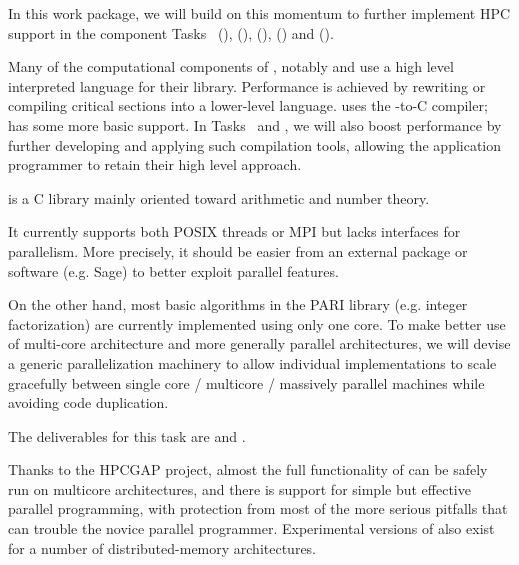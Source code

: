 \begin{workpackage}
\begin{wpdescription}
  In this work package, we will build on this momentum to further implement HPC support in
  the component Tasks~ (\Pari), (\GAP),
   (\Linbox), (\MPIR) and
   (\Singular).
  
  Many of the computational components of \TheProject, notably \Sage
  and \GAP use a high level
  interpreted language for their library. Performance is achieved by
  rewriting or compiling critical sections into a lower-level
  language. \Sage uses
  the \Cython \Python-to-C compiler; \GAP has some more basic support.
  In Tasks~ and , we will also boost performance by
  further developing and applying such compilation tools, allowing the
  application programmer to retain their high level approach.

\end{wpdescription}
\begin{tasklist}
\begin{task}[title=PARI,id=hpc-pari,PM=20, lead=UB]
  \Pari is a C library mainly oriented toward arithmetic and number theory.
  
  It currently supports both POSIX threads or MPI but lacks interfaces for
  parallelism. More precisely, it should be easier from an external package
  or software (e.g. Sage) to better exploit \Pari parallel features.

  On the other hand, most basic algorithms in the PARI library (e.g. integer
  factorization) are currently implemented using only one core. To
  make better use of multi-core architecture and more generally parallel
  architectures, we will devise a generic parallelization machinery
  to allow individual implementations to scale gracefully between single
  core / multicore / massively parallel machines while avoiding code
  duplication.

  The deliverables for this task are  and .
\end{task}


\begin{task}[title=GAP,id=hpc-gap,PM=18, lead=SA]
  Thanks to the HPCGAP project, almost the full functionality of \GAP
  can be safely run on multicore architectures, and there is support for
  simple but effective parallel programming, with protection from most
  of the more serious pitfalls that can trouble the novice parallel
  programmer. Experimental versions of \GAP also exist for a number of
  distributed-memory architectures.



\end{task}
\end{tasklist}
\end{workpackage}
